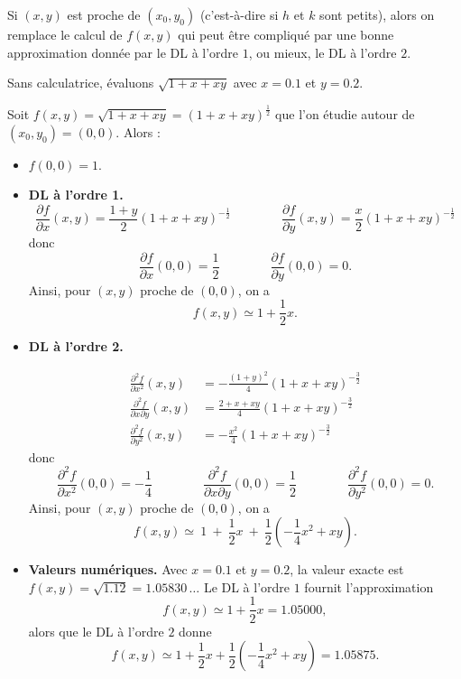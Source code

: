 Si $(x,y)$ est proche de $(x_0,y_0)$ (c'est-à-dire si $h$ et $k$ sont petits), alors on remplace le calcul de $f(x,y)$ qui peut être compliqué par une bonne approximation donnée par le DL à l'ordre $1$, ou mieux, le DL à l'ordre $2$.

\begin{exemple}
Sans calculatrice, évaluons $\sqrt{1+x+xy}$ avec $x=0.1$ et $y=0.2$.

Soit $f(x,y) = \sqrt{1+x+xy} = (1+x+xy)^{\frac12}$ que l'on étudie autour de $(x_0,y_0)=(0,0)$.
Alors :
\begin{itemize}
    \item $f(0,0) = 1$.
    
    \item \textbf{DL à l'ordre 1.}
    $$\frac{\partial f}{\partial x}(x,y) = \frac{1+y}{2}(1+x+xy)^{-\frac12}
    \qquad\qquad
    \frac{\partial f}{\partial y}(x,y) = \frac{x}{2}(1+x+xy)^{-\frac12}$$
    donc
    $$\frac{\partial f}{\partial x}(0,0) = \frac12
    \qquad\qquad
    \frac{\partial f}{\partial y}(0,0) = 0.$$
    Ainsi, pour $(x,y)$ proche de $(0,0)$, on a  
    $$f(x,y) \simeq 1+\frac12x.$$ 
      
    \item \textbf{DL à l'ordre 2.} 
    
    \begin{align*}
    \frac{\partial^2f}{\partial x^2}(x,y) &=  -\frac{(1+y)^2}{4}(1+x+xy)^{-\frac32}\\
    \frac{\partial^2f}{\partial x\partial y}(x,y) &= \frac{2+x+xy}{4}(1+x+xy)^{-\frac32}\\
    \frac{\partial^2f}{\partial y^2}(x,y) &= -\frac{x^2}{4}(1+x+xy)^{-\frac32}
    \end{align*}
    donc 
    $$\frac{\partial^2f}{\partial x^2}(0,0) = -\frac14\qquad \qquad
    \frac{\partial^2f}{\partial x\partial y}(0,0) = \frac12 \qquad\qquad
    \frac{\partial^2f}{\partial y^2}(0,0) = 0.$$ 
    Ainsi, pour $(x,y)$ proche de $(0,0)$, on a 
    $$   
    f(x,y) 
    \simeq \ 1 \  + \  \frac12x
    \  +\ 
    \frac12\left(-\frac14x^2+ xy\right).
    $$
    
      
\item \textbf{Valeurs numériques.}
    Avec $x=0.1$ et $y=0.2$, la valeur exacte est $f(x,y) = \sqrt{1.12} = 1.05830\,\ldots$
    Le DL à l'ordre $1$ fournit l'approximation 
    $$f(x,y) \simeq 1+\frac12x = 1.05000,$$    
    alors que le DL à l'ordre $2$ donne
    $$f(x,y) \simeq 1 + \frac12x + \frac12\left(-\frac14x^2+ xy\right) = 1.05875.$$   
    
\end{itemize}  
       
\end{exemple}   
  

